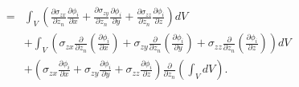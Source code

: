\begin{eqnarray}
&=& \int_V \left(\frac{\partial \sigma_{zx}}{\partial z_n}\frac{\partial \phi_i}{\partial x} +\frac{\partial \sigma_{zy}}{\partial z_n} \frac{\partial \phi_i}{\partial y} + \frac{\partial \sigma_{zz}}{\partial z_n}\frac{\partial \phi_i}{\partial z}  \right) dV \nonumber\\
&&+ \int_V \left(\sigma_{zx} \frac{\partial}{\partial z_n} \left(\frac{\partial \phi_i}{\partial x}\right)+ \sigma_{zy} \frac{\partial}{\partial z_n} \left(\frac{\partial \phi_i}{\partial y}\right) + \sigma_{zz} \frac{\partial}{\partial z_n} \left(\frac{\partial \phi_i}{\partial z}\right) \right) dV \nonumber\\
&& + \left(  \sigma_{zx} \frac{\partial \phi_i}{\partial x} + \sigma_{zy} \frac{\partial \phi_i}{\partial y} + \sigma_{zz} \frac{\partial \phi_i}{\partial z} \right) \frac{\partial}{\partial z_n} \left(\int_V dV \right).
\label{dRz}
\end{eqnarray}
